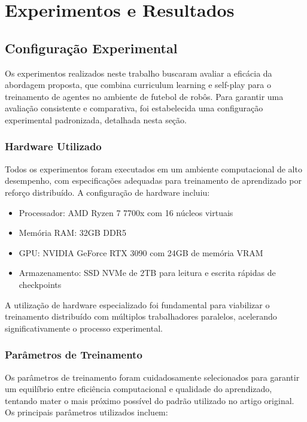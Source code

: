 \chapter{Experimentos e Resultados}
\label{cap:resultados}

\section{Configuração Experimental}
\label{sec:configuracao_experimental}

Os experimentos realizados neste trabalho buscaram avaliar a eficácia da abordagem proposta, que combina curriculum learning e self-play para o treinamento de agentes no ambiente de futebol de robôs. Para garantir uma avaliação consistente e comparativa, foi estabelecida uma configuração experimental padronizada, detalhada nesta seção.

\subsection{Hardware Utilizado}

Todos os experimentos foram executados em um ambiente computacional de alto desempenho, com especificações adequadas para treinamento de aprendizado por reforço distribuído. A configuração de hardware incluiu:

\begin{itemize}
    \item Processador: AMD Ryzen 7 7700x com 16 núcleos virtuais
    \item Memória RAM: 32GB DDR5
    \item GPU: NVIDIA GeForce RTX 3090 com 24GB de memória VRAM
    \item Armazenamento: SSD NVMe de 2TB para leitura e escrita rápidas de checkpoints
\end{itemize}

A utilização de hardware especializado foi fundamental para viabilizar o treinamento distribuído com múltiplos trabalhadores paralelos, acelerando significativamente o processo experimental.

\subsection{Parâmetros de Treinamento}

Os parâmetros de treinamento foram cuidadosamente selecionados para garantir um equilíbrio entre eficiência computacional e qualidade do aprendizado, tentando mater o mais próximo possível do padrão utilizado no artigo original. Os principais parâmetros utilizados incluem:

